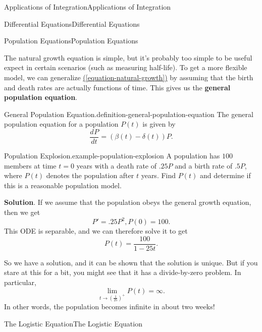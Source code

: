 \documentclass[10pt,]{book}
\newcommand{\terminology}[1]{\textbf{#1}}
\numberwithin{equation}{section}
\newcommand{\dv}[3][]{\dfrac{d^{#1} #2}{d #3^{#1}}}
\begin{document}
\begin{chapterptx}{Applications of Integration}{}{Applications of Integration}{}{}
\begin{sectionptx}{Differential Equations}{}{Differential Equations}{}{}
\begin{subsectionptx}{Population Equations}{}{Population Equations}{}{}
\par
\hypertarget{p-738}{}%
The natural growth equation is simple, but it's probably too simple to be useful expect in certain scenarios (such as measuring half-life). To get a more flexible model, we can generalize \hyperref[equation-natural-growth]{(\ref{equation-natural-growth})} by assuming that the birth and death rates are actually functions of time. This gives us the \terminology{general population equation}.%
\begin{definition}{General Population Equation.}{definition-general-population-equation}%
\hypertarget{p-739}{}%
The general population equation for a population \(P(t)\) is given by%
\begin{equation*}
\dv{P}{t} = (\beta(t) - \delta(t))P.
\end{equation*}
%
\end{definition}
\begin{example}{Population Explosion.}{example-population-explosion}%
\hypertarget{p-740}{}%
A population has \(100\) members at time \(t = 0\) years with a death rate of \(.25P\) and a birth rate of \(.5P\), where \(P(t)\) denotes the population after \(t\) years. Find \(P(t)\) and determine if this is a reasonable population model.%
\par\smallskip%
\noindent\textbf{Solution}.\hypertarget{solution-155}{}\quad%
\hypertarget{p-741}{}%
If we assume that the population obeys the general growth equation, then we get%
\begin{equation*}
P' = .25P^{2}, P(0) = 100.
\end{equation*}
This ODE is separable, and we can therefore solve it to get%
\begin{equation*}
P(t) = \frac{100}{1 - 25t}.
\end{equation*}
%
\par
\hypertarget{p-742}{}%
So we have a solution, and it can be shown that the solution is unique. But if you stare at this for a bit, you might see that it has a divide-by-zero problem. In particular,%
\begin{equation*}
\lim_{t\to(\frac{1}{25})^{+}}P(t) = \infty.
\end{equation*}
In other words, the population becomes infinite in about two weeks!%
\end{example}
\end{subsectionptx}
%
%
\typeout{************************************************}
\typeout{************************************************}
%
\begin{subsectionptx}{The Logistic Equation}{}{The Logistic Equation}{}{}\label{subsection-the-logistic-equation}

\end{subsectionptx}
\end{sectionptx}
\end{chapterptx}
\end{document}
